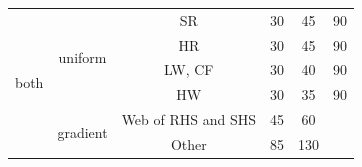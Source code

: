 \begin{table}[htbp]
\begin{tabular}{ccc|ccc}
	                \multirow{6}[0]{*}{both}                 &            \multirow{4}[0]{*}{uniform}             &         SR         &       30       &       45       &       90       \\
	                                                         &                                                    &         HR         &       30       &       45       &       90       \\
	                                                         &                                                    &       LW, CF       &       30       &       40       &       90       \\
	                                                         &                                                    &         HW         &       30       &       35       &       90       \\
	                     \cmidrule{2-6}                      &            \multirow{2}[0]{*}{gradient}             & Web of RHS and SHS &       45       &       60       &                \\
	                                                         &                                                    &       Other        &       85       &      130       &                \\ \bottomrule
\end{tabular}
\end{table}

